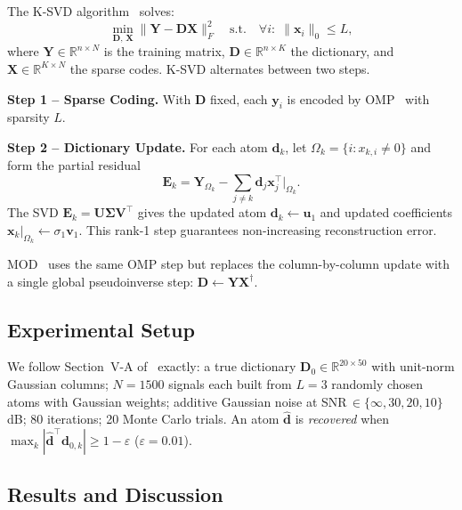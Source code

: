 \documentclass[conference]{IEEEtran}
\begin{document}
The K-SVD algorithm~\cite{aharon2006ksvd} solves:
\begin{equation}
    \min_{\mathbf{D},\,\mathbf{X}}
    \|\mathbf{Y} - \mathbf{D}\mathbf{X}\|_F^2
    \quad\text{s.t.}\quad
    \forall i:\;\|\mathbf{x}_i\|_0 \leq L,
    \label{eq:ksvd_obj}
\end{equation}
where $\mathbf{Y}\!\in\!\mathbb{R}^{n\times N}$ is the training
matrix, $\mathbf{D}\!\in\!\mathbb{R}^{n\times K}$ the dictionary,
and $\mathbf{X}\!\in\!\mathbb{R}^{K\times N}$ the sparse codes.
K-SVD alternates between two steps.

\textbf{Step 1 -- Sparse Coding.}
With $\mathbf{D}$ fixed, each $\mathbf{y}_i$ is encoded by OMP~\cite{pati1993omp} with sparsity $L$.

\textbf{Step 2 -- Dictionary Update.}
For each atom $\mathbf{d}_k$, let $\Omega_k=\{i:x_{k,i}\neq 0\}$
and form the partial residual
\begin{equation}
    \mathbf{E}_k =
    \mathbf{Y}_{\Omega_k}
    - \textstyle\sum_{j\neq k}\mathbf{d}_j\mathbf{x}_j^\top\big|_{\Omega_k}.
\end{equation}
The SVD $\mathbf{E}_k=\mathbf{U\Sigma V}^\top$ gives the updated
atom $\mathbf{d}_k\leftarrow\mathbf{u}_1$ and updated coefficients
$\mathbf{x}_k|_{\Omega_k}\leftarrow\sigma_1\mathbf{v}_1$.
This rank-1 step guarantees non-increasing reconstruction error.

MOD~\cite{engan1999mod} uses the same OMP step but replaces the
column-by-column update with a single global pseudoinverse step:
$\mathbf{D}\leftarrow\mathbf{Y}\mathbf{X}^\dagger$.

\subsection{Experimental Setup}

We follow Section~V-A of~\cite{aharon2006ksvd} exactly:
a true dictionary $\mathbf{D}_0\!\in\!\mathbb{R}^{20\times50}$
with unit-norm Gaussian columns; $N=1500$ signals each built from
$L=3$ randomly chosen atoms with Gaussian weights; additive
Gaussian noise at SNR$\,\in\{\infty,30,20,10\}$\,dB; 80
iterations; 20 Monte Carlo trials.
An atom $\hat{\mathbf{d}}$ is \emph{recovered} when
$\max_k|\hat{\mathbf{d}}^\top\mathbf{d}_{0,k}|\geq 1-\varepsilon$
($\varepsilon=0.01$).

\subsection{Results and Discussion}
\end{document}
